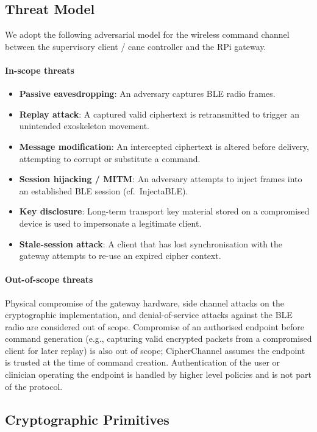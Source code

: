 \documentclass[journal]{IEEEtran}
\begin{document}
\subsection{Threat Model}
\label{sec:threatmodel}

We adopt the following adversarial model for the wireless command channel between the supervisory client / cane controller and the RPi gateway.

\paragraph{In-scope threats}
\begin{itemize}
  \item \textbf{Passive eavesdropping}: An adversary captures BLE radio frames.
  \item \textbf{Replay attack}: A captured valid ciphertext is retransmitted to trigger an unintended exoskeleton movement.
  \item \textbf{Message modification}: An intercepted ciphertext is altered before delivery, attempting to corrupt or substitute a command.
  \item \textbf{Session hijacking / MITM}: An adversary attempts to inject frames into an established BLE session (cf.\ InjectaBLE).
  \item \textbf{Key disclosure}: Long-term transport key material stored on a compromised device is used to impersonate a legitimate client.
  \item \textbf{Stale-session attack}: A client that has lost synchronisation with the gateway attempts to re-use an expired cipher context.
\end{itemize}

\paragraph{Out-of-scope threats}
Physical compromise of the gateway hardware, side channel attacks on the cryptographic implementation, and denial-of-service attacks against the BLE radio are considered out of scope. Compromise of an authorised endpoint before command generation (e.g., capturing valid encrypted packets from a compromised client for later replay) is also out of scope; CipherChannel assumes the endpoint is trusted at the time of command creation. Authentication of the user or clinician operating the endpoint is handled by higher level policies and is not part of the protocol.

\subsection{Cryptographic Primitives}
\end{document}

